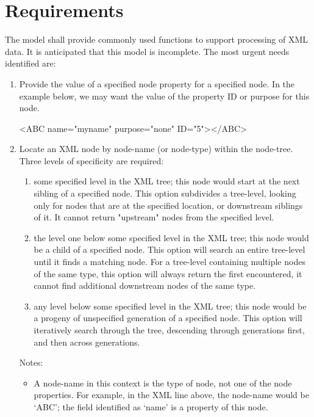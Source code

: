 \documentclass[11pt,fleqn]{report}
\begin{document}
\chapter {Requirements}
The model shall provide commonly used functions to support processing of XML
data. It is anticipated that this model is incomplete. The most urgent needs
identified are:
\begin{enumerate}
  \item  Provide the value of a specified node property for a specified node.
  In the example below, we may want the value of the property ID or purpose for
  this node.
  \begin{codeC}
    <ABC name="myname" purpose="none" ID="5"></ABC>
  \end{codeC}
  \item Locate an XML node by node-name (or node-type) within the node-tree.
  Three levels of specificity are required:
  \begin{enumerate}
    \item some specified level in the XML tree; this node would start at the
    next sibling of a specified node. This option subdivides a tree-level,
    looking only for nodes that are at the specified location, or downstream
    siblings of it. It cannot return "upstream" nodes from the specified level.
    \item the level one below some specified level in the XML tree; this node
    would be a child of a specified node. This option will search an entire
    tree-level until it finds a matching node. For a tree-level containing
    multiple nodes of the same type, this option will always return the
    first encountered, it cannot find additional downstream nodes of the
    same type.
    \item any level below some specified level in the XML tree; this node
    would be a progeny of unspecified generation of a specified node. This
    option will iteratively search through the tree, descending through
    generations first, and then across generations.
  \end{enumerate}
  Notes:
  \begin{itemize}
    \item A node-name in this context is the type of node, not one of the
    node properties. For example, in the XML line above, the node-name would
    be `ABC'; the field identified as `name' is a property of this node.
  \end{itemize}
\end{enumerate}
\end{document}
